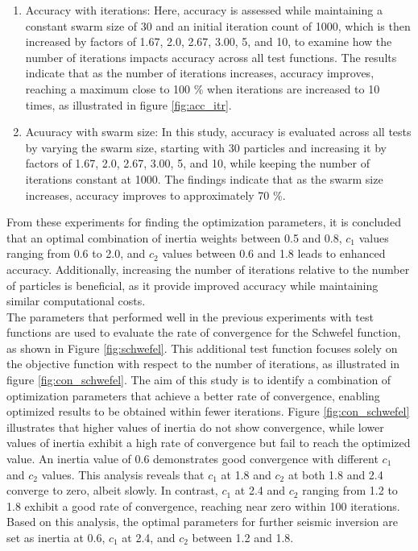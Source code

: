 \documentclass[paper,revised]{geophysics}
\begin{document}
\begin{enumerate}
	\item Accuracy with iterations: Here, accuracy is assessed while maintaining a constant swarm size of 30 and an initial iteration count of 1000, which is then increased by factors of 1.67, 2.0, 2.67, 3.00, 5, and 10, to examine how the number of iterations impacts accuracy across all test functions. The results indicate that as the number of iterations increases, accuracy improves, reaching a maximum close to 100 \% when iterations are increased to 10 times, as illustrated in figure \ref{fig:acc_itr}.
	
	\item Acuuracy with swarm size: In this study, accuracy is evaluated across all tests by varying the swarm size, starting with 30 particles and increasing it by factors of 1.67, 2.0, 2.67, 3.00, 5, and 10, while keeping the number of iterations constant at 1000. The findings indicate that as the swarm size increases, accuracy improves to approximately 70 \%.
\end{enumerate}
From these experiments for finding the optimization parameters, it is concluded that an optimal combination of inertia weights between 0.5 and 0.8, \(c_1\) values ranging from 0.6 to 2.0, and \(c_2\) values between 0.6 and 1.8 leads to enhanced accuracy. Additionally, increasing the number of iterations relative to the number of particles is beneficial, as it provide improved accuracy while maintaining similar computational costs.
\\
The parameters that performed well in the previous experiments with test functions are used to evaluate the rate of convergence for the Schwefel function, as shown in Figure \ref{fig:schwefel}. This additional test function focuses solely on the objective function with respect to the number of iterations, as illustrated in figure \ref{fig:con_schwefel}. The aim of this study is to identify a combination of optimization parameters that achieve a better rate of convergence, enabling optimized results to be obtained within fewer iterations. Figure \ref{fig:con_schwefel} illustrates that higher values of inertia do not show convergence, while lower values of inertia exhibit a high rate of convergence but fail to reach the optimized value. An inertia value of 0.6 demonstrates good convergence with different \(c_1\) and \(c_2\) values. This analysis reveals that \(c_1\) at 1.8 and \(c_2\) at both 1.8 and 2.4 converge to zero, albeit slowly. In contrast, \(c_1\) at 2.4 and \(c_2\) ranging from 1.2 to 1.8 exhibit a good rate of convergence, reaching near zero within 100 iterations. Based on this analysis, the optimal parameters for further seismic inversion are set as inertia at 0.6, \(c_1\) at 2.4, and \(c_2\) between 1.2 and 1.8.
\end{document}
